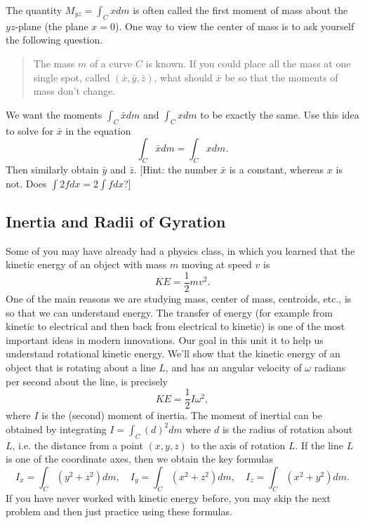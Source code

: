 \begin{problem}\label{center of mass alternate approach}
 The quantity $M_{yz}=\int_C x dm$ is often called the first moment of mass about the $yz$-plane (the plane $x=0$).
 One way to view the center of mass is to ask yourself the following question.
\begin{quote}
 The mass $m$ of a curve $C$ is known. If you could place all the mass at one single spot, called $(\bar x,\bar y, \bar z)$, what should $\bar x$ be so that the moments of mass don't change. 
\end{quote}
We want the moments $\int_C \bar xdm$ and $\int_C x dm$ to be exactly the same.
Use this idea to solve for $\bar x$ in the equation $$\int_C \bar xdm = \int_C x dm.$$ 
Then similarly obtain $\bar y$ and $\bar z$. [Hint: the number $\bar x$ is a constant, whereas $x$ is not. Does $\int 2fdx = 2\int fdx$?]
\end{problem}



\subsection{Inertia and Radii of Gyration}

Some of you may have already had a physics class, in which you learned that the kinetic energy of an object with mass $m$ moving at speed $v$ is $$KE = \frac{1}{2}mv^2.$$
One of the main reasons we are studying mass, center of mass, centroids, etc., is so that we can understand energy. The transfer of energy (for example from kinetic to electrical and then back from electrical to kinetic) is one of the most important ideas in modern innovations. Our goal in this unit it to help us understand rotational kinetic energy. We'll show that the kinetic energy of an object that is rotating about a line $L$, and has an angular velocity of $\omega$ radians per second about the line, is precisely $$KE = \frac{1}{2}I \omega^2,$$
where $I$ is the (second) moment of inertia. The moment of inertial can be obtained by integrating $I=\int_C (d)^2 dm$ where $d$ is the radius of rotation about $L$, i.e. the distance from a point $(x,y,z)$ to the axis of rotation $L$. If the line $L$ is one of the coordinate axes, then we obtain the key formulas 
$$
I_x = \int_C (y^2+z^2)dm,\quad
I_y = \int_C (x^2+z^2)dm,\quad
I_z = \int_C (x^2+y^2)dm
.$$
If you have never worked with kinetic energy before, you may skip the next problem and then just practice using these formulas.

